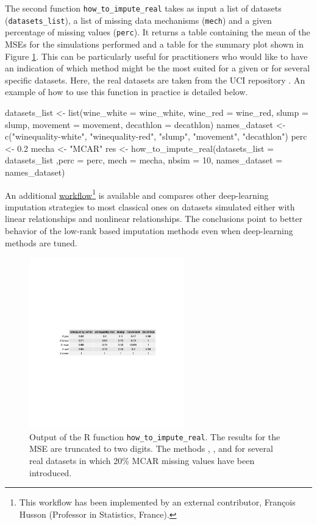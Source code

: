 The second function \texttt{how\_to\_impute\_real} takes as input a list of datasets (\texttt{datasets\_list}), a list of missing data mechanisms (\texttt{mech}) and a given percentage of missing values (\texttt{perc}). It returns a table containing the mean of the MSEs for the simulations performed and a table for the summary plot shown in Figure \ref{fig:howtoimpute_real}. This can be particularly useful for practitioners who would like to have an indication of which method might be the most suited for a given or for several specific datasets.
Here, the real datasets are taken from the UCI repository \citep{dua_2019}. An example of how to use this function in practice is detailed below.

\begin{example}
datasets_list <- list(wine_white = wine_white, wine_red = wine_red, slump = slump, 
                        movement = movement, decathlon = decathlon)
names_dataset <- c("winequality-white", "winequality-red", "slump", "movement", "decathlon") 
perc <- 0.2
mecha <- "MCAR" 
res <-  how_to_impute_real(datasets_list = datasets_list ,perc = perc, mech = mecha, 
                                    nbsim = 10, names_dataset = names_dataset)
\end{example}




An additional \href{https://rmisstastic.netlify.app/how-to/external/comparison_imputation_deep_classical}{workﬂow}\footnote{This workflow has been implemented by an external contributor, Fran\c{c}ois Husson (Professor in Statistics, France).} is available and compares other deep-learning imputation strategies to most classical ones on datasets simulated either with linear relationships and nonlinear relationships. The conclusions point to better behavior of the low-rank based imputation methods even when deep-learning methods are tuned.


\begin{figure}
    \centering
    \includegraphics[width=0.6\textwidth]{figures/HowToImpute_table.pdf}
    \caption{\label{fig:howtoimpute_real} Output of the {R} function \texttt{how\_to\_impute\_real}. The results for the MSE are truncated to two digits. The methods , ,  and  for several real datasets in which 20\% MCAR missing values have been introduced.}
\end{figure}

